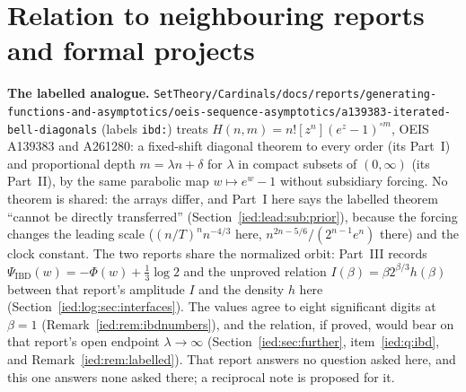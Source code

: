 \documentclass[11pt,letterpaper]{article}
\theoremstyle{remark}\newtheorem{remark}[theorem]{Remark}
\newcommand{\file}[1]{\nolinkurl{#1}}
\begin{document}
\section*{Relation to neighbouring reports and formal projects}\label{ied:sec:neighbours}
\textbf{The labelled analogue.} \file{SetTheory/Cardinals/docs/reports/generating-functions-and-asymptotics/oeis-sequence-asymptotics/a139383-iterated-bell-diagonals} (labels \texttt{ibd:}) treats $H(n,m)=n![z^n](e^z-1)^{\circ m}$, OEIS A139383 and A261280: a fixed-shift diagonal theorem to every order (its Part~I) and proportional depth $m=\lambda n+\delta$ for $\lambda$ in compact subsets of $(0,\infty)$ (its Part~II), by the same parabolic map $w\mapsto e^w-1$ without subsidiary forcing. No theorem is shared: the arrays differ, and Part~I here says the labelled theorem ``cannot be directly transferred'' (Section~\ref{ied:lead:sub:prior}), because the forcing changes the leading scale ($(n/T)^n n^{-4/3}$ here, $n^{2n-5/6}/(2^{n-1}e^n)$ there) and the clock constant. The two reports share the normalized orbit: Part~III records $\Psi_{\mathrm{IBD}}(w)=-\Phi(w)+\frac13\log2$ and the unproved relation $I(\beta)=\beta2^{\beta/3}h(\beta)$ between that report's amplitude $I$ and the density $h$ here (Section~\ref{ied:log:sec:interfaces}). The values agree to eight significant digits at $\beta=1$ (Remark~\ref{ied:rem:ibdnumbers}), and the relation, if proved, would bear on that report's open endpoint $\lambda\to\infty$ (Section~\ref{ied:sec:further}, item~\ref{ied:q:ibd}, and Remark~\ref{ied:rem:labelled}). That report answers no question asked here, and this one answers none asked there; a reciprocal note is proposed for it.
\end{document}
